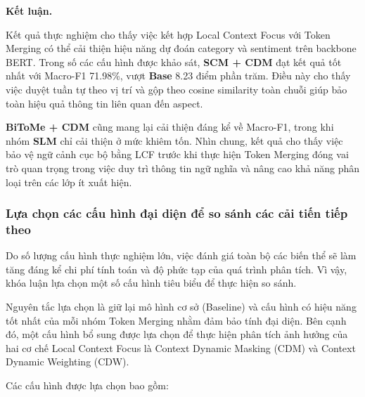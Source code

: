 \textbf{Kết luận.}

Kết quả thực nghiệm cho thấy việc kết hợp Local Context Focus với Token Merging có thể cải thiện hiệu năng dự đoán category và sentiment trên backbone BERT. Trong số các cấu hình được khảo sát, \textbf{SCM + CDM} đạt kết quả tốt nhất với Macro-F1 71.98\%, vượt \textbf{Base} 8.23 điểm phần trăm. Điều này cho thấy việc duyệt tuần tự theo vị trí và gộp theo cosine similarity toàn chuỗi giúp bảo toàn hiệu quả thông tin liên quan đến aspect.

\textbf{BiToMe + CDM} cũng mang lại cải thiện đáng kể về Macro-F1, trong khi nhóm \textbf{SLM} chỉ cải thiện ở mức khiêm tốn. Nhìn chung, kết quả cho thấy việc bảo vệ ngữ cảnh cục bộ bằng LCF trước khi thực hiện Token Merging đóng vai trò quan trọng trong việc duy trì thông tin ngữ nghĩa và nâng cao khả năng phân loại trên các lớp ít xuất hiện.

\subsubsection*{Lựa chọn các cấu hình đại diện để so sánh các cải tiến tiếp theo }
Do số lượng cấu hình thực nghiệm lớn, việc đánh giá toàn bộ các biến thể sẽ làm tăng đáng kể chi phí tính toán và độ phức tạp của quá trình phân tích. Vì vậy, khóa luận lựa chọn một số cấu hình tiêu biểu để thực hiện so sánh.

Nguyên tắc lựa chọn là giữ lại mô hình cơ sở (Baseline) và cấu hình có hiệu năng tốt nhất của mỗi nhóm Token Merging nhằm đảm bảo tính đại diện. Bên cạnh đó, một cấu hình bổ sung được lựa chọn để thực hiện phân tích ảnh hưởng của hai cơ chế Local Context Focus là Context Dynamic Masking (CDM) và Context Dynamic Weighting (CDW).

Các cấu hình được lựa chọn bao gồm:

